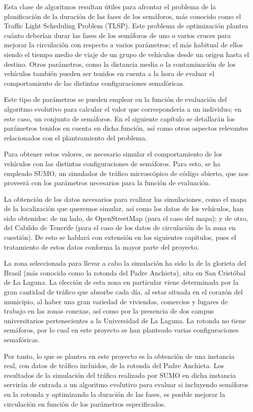 Esta clase de algoritmos resultan útiles para afrontar el problema de la planificación de la duración de las fases de los semáforos, más conocido como el {Traffic Light Scheduling Problem} (TLSP). Este problema de optimización plantea cuánto deberían durar las fases de los semáforos de uno o varios cruces para mejorar la circulación con respecto a varios parámetros; el más habitual de ellos siendo el tiempo medio de viaje de un grupo de vehículos desde un origen hasta el destino. Otros parámetros, como la distancia media o la contaminación de los vehículos también pueden ser tenidos en cuenta a la hora de evaluar el comportamiento de las distintas configuraciones semafóricas. 

Este tipo de parámetros se pueden emplear en la función de evaluación del algoritmo evolutivo para calcular el valor que correspondería a un individuo; en este caso, un conjunto de semáforos. En el siguiente capítulo se detallarán los parámetros tenidos en cuenta en dicha función, así como otros aspectos relevantes relacionados con el planteamiento del problema.

Para obtener estos valores, es necesario simular el comportamiento de los vehículos con las distintas configuraciones de semáforos. Para esto, se ha empleado SUMO, un simulador de tráfico microscópico de código abierto, que nos proveerá con los parámetros necesarios para la función de evaluación.

La obtención de los datos necesarios para realizar las simulaciones, como el mapa de la localización que queremos simular, así como los datos de los vehículos, han sido obtenidos: de un lado, de OpenStreetMap (para el caso del mapa); y de otro, del Cabildo de Tenerife (para el caso de los datos de circulación de la zona en cuestión). De esto se hablará con extensión en los siguientes capítulos, pues el tratamiento de estos datos conforma la mayor parte del proyecto.

La zona seleccionada para llevar a cabo la simulación ha sido la de la glorieta del Brasil (más conocida como la rotonda del Padre Anchieta), sita en San Cristóbal de La Laguna. La elección de esta zona en particular viene determinada por la gran cantidad de tráfico que absorbe cada día, al estar situada en el corazón del municipio, al haber una gran variedad de viviendas, comercios y lugares de trabajo en las zonas conexas, así como por la presencia de dos campus universitarios pertenecientes a la Universidad de La Laguna. La rotonda no tiene semáforos, por lo cual en este proyecto se han planteado varias configuraciones semafóricas.

Por tanto, lo que se plantea en este proyecto es la obtención de una instancia real, con datos de tráfico incluidos, de la rotonda del Padre Anchieta. Los resultados de la simulación del tráfico realizada por SUMO en dicha instancia servirán de entrada a un algoritmo evolutivo para evaluar si incluyendo semáforos en la rotonda y optimizando la duración de las fases, es posible mejorar la circulación en función de los parámetros especificados.

